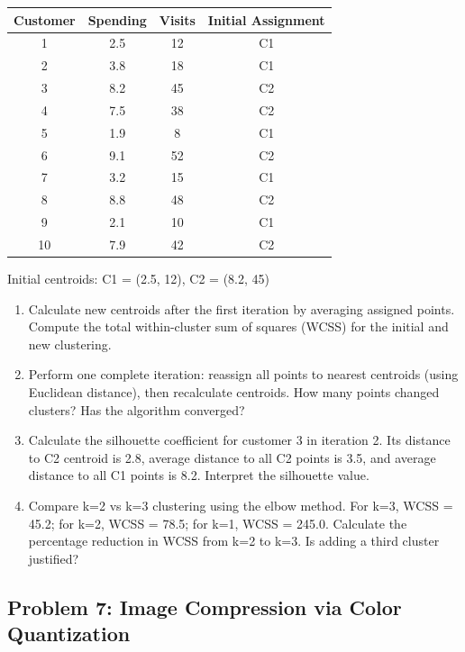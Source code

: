\documentclass[12pt]{article}
\begin{document}
\begin{center}
\begin{tabular}{cccc}
\toprule
Customer & Spending & Visits & Initial Assignment \\
\midrule
1 & 2.5 & 12 & C1 \\
2 & 3.8 & 18 & C1 \\
3 & 8.2 & 45 & C2 \\
4 & 7.5 & 38 & C2 \\
5 & 1.9 & 8 & C1 \\
6 & 9.1 & 52 & C2 \\
7 & 3.2 & 15 & C1 \\
8 & 8.8 & 48 & C2 \\
9 & 2.1 & 10 & C1 \\
10 & 7.9 & 42 & C2 \\
\bottomrule
\end{tabular}
\end{center}

Initial centroids: C1 = (2.5, 12), C2 = (8.2, 45)

\begin{enumerate}[label=(\alph*)]
\item Calculate new centroids after the first iteration by averaging assigned points. Compute the total within-cluster sum of squares (WCSS) for the initial and new clustering.

\item Perform one complete iteration: reassign all points to nearest centroids (using Euclidean distance), then recalculate centroids. How many points changed clusters? Has the algorithm converged?

\item Calculate the silhouette coefficient for customer 3 in iteration 2. Its distance to C2 centroid is 2.8, average distance to all C2 points is 3.5, and average distance to all C1 points is 8.2. Interpret the silhouette value.

\item Compare k=2 vs k=3 clustering using the elbow method. For k=3, WCSS = 45.2; for k=2, WCSS = 78.5; for k=1, WCSS = 245.0. Calculate the percentage reduction in WCSS from k=2 to k=3. Is adding a third cluster justified?
\end{enumerate}

\subsection*{Problem 7: Image Compression via Color Quantization}
\end{document}
